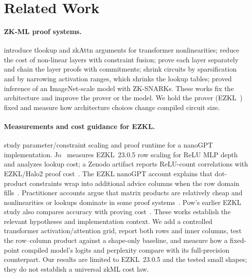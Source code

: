 \documentclass[10pt]{article}
\begin{document}
\section{Related Work}
\label{sec:related}

\paragraph{ZK-ML proof systems.}
\citet{zkllm2024} introduce tlookup and zkAttn arguments for transformer
nonlinearities; \citet{zkgpt2025} reduce the cost of non-linear layers with
constraint fusion; \citet{nanozk2026} prove each layer separately and chain the
layer proofs with commitments; \citet{telescarse2025} shrink circuits by
sparsification and by narrowing activation ranges, which shrinks the lookup
tables; \citet{kang2022scaling} proved inference of an ImageNet-scale model with
ZK-SNARKs. These works fix the architecture and improve the prover or the
model. We hold the prover (EZKL~\citep{ezkl}) fixed and measure how architecture
choices change compiled circuit size.

\paragraph{Measurements and cost guidance for EZKL.}
\citet{ganescu2024} study parameter/constraint scaling and proof runtime for a
nanoGPT implementation. Jo~\citep{jo2026} measures EZKL~23.0.5 row scaling for
ReLU MLP depth and analyzes lookup cost; a Zenodo artifact reports ReLU-count
correlations with EZKL/Halo2 proof cost~\citep{zkcostaware2026}. The EZKL
nanoGPT account explains that dot-product constraints wrap into additional
advice columns when the row domain fills~\citep{ezklnanogpt2023}. Practitioner
accounts argue that matrix products are relatively cheap and nonlinearities or
lookups dominate in some proof systems~\citep{pow2024,gupta2026}. Pow's earlier
EZKL study also compares accuracy with proving cost~\citep{pow2024}. These
works establish the relevant hypotheses and implementation context. We add a
controlled transformer activation/attention grid, report both rows and inner
columns, test the row--column product against a shape-only baseline, and measure
how a fixed-point compiled model's logits and perplexity compare with its
full-precision counterpart. Our results are limited to EZKL~23.0.5 and the
tested small shapes; they do not establish a universal zkML cost law.
\end{document}
